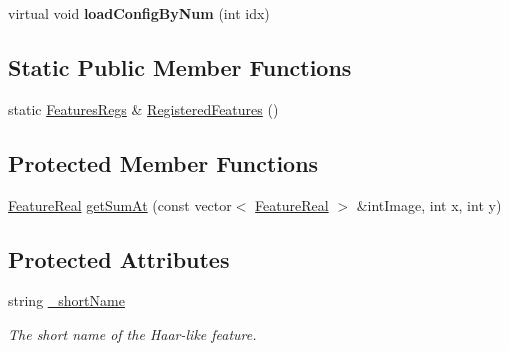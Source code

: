 \begin{DoxyCompactItemize}
\item 
\hypertarget{classMultiBoost_1_1HaarFeature_a866a651053e58bcb5a43b95b1abffb6d}{
virtual void {\bfseries loadConfigByNum} (int idx)}
\label{classMultiBoost_1_1HaarFeature_a866a651053e58bcb5a43b95b1abffb6d}

\end{DoxyCompactItemize}
\subsection*{Static Public Member Functions}
\begin{DoxyCompactItemize}
\item 
static \hyperlink{classMultiBoost_1_1HaarFeature_1_1FeaturesRegs}{FeaturesRegs} \& \hyperlink{classMultiBoost_1_1HaarFeature_a790210b2a24870952aec0569e2474c3a}{RegisteredFeatures} ()
\end{DoxyCompactItemize}
\subsection*{Protected Member Functions}
\begin{DoxyCompactItemize}
\item 
\hyperlink{Defaults_8h_a3a11cfe6a5d469d921716ca6291e934f}{FeatureReal} \hyperlink{classMultiBoost_1_1HaarFeature_adba727c362cdb3472a32c54c76f74ac1}{getSumAt} (const vector$<$ \hyperlink{Defaults_8h_a3a11cfe6a5d469d921716ca6291e934f}{FeatureReal} $>$ \&intImage, int x, int y)
\end{DoxyCompactItemize}
\subsection*{Protected Attributes}
\begin{DoxyCompactItemize}
\item 
\hypertarget{classMultiBoost_1_1HaarFeature_a0006d279446199c7548dde9c58d14a44}{
string \hyperlink{classMultiBoost_1_1HaarFeature_a0006d279446199c7548dde9c58d14a44}{\_\-shortName}}
\label{classMultiBoost_1_1HaarFeature_a0006d279446199c7548dde9c58d14a44}

\begin{DoxyCompactList}\small\item\em The short name of the Haar-\/like feature. \end{DoxyCompactList}\end{DoxyCompactItemize}


